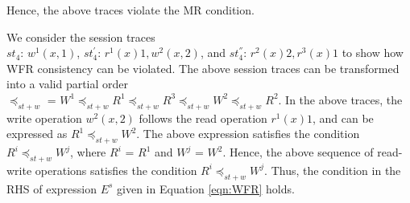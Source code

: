 \documentclass[journal,compsoc]{IEEEtran}
\begin{document}
    Hence, the above traces violate the MR condition.
\par  We consider the session traces \\ $\mathit{st}_4$: $w^1(x,1)$, $\mathit{st}_4^{'}$: $r^1(x){1}, w^2(x,2)$, and
 $\mathit{st}_4^{''}$: $r^2(x){2}, r^3(x){1}$ to show how
 WFR consistency can be violated. The above session traces can be transformed into a valid partial order \\
 $\preccurlyeq_{\mathit{st}+w}$  = $W^1 \preccurlyeq_{\mathit{st}+w} R^1 \preccurlyeq_{\mathit{st}+w} R^3 \preccurlyeq_{\mathit{st}+w} W^2 \preccurlyeq_{\mathit{st}+w} R^2$. In the above traces, the write operation $w^2(x,2)$ follows
  the read operation $r^1(x){1}$, and can be expressed as $R^1 \preccurlyeq_{\mathit{st}+w} W^2$. 	The above expression satisfies
 the condition $R^i \preccurlyeq_{\mathit{st}+w} W^j$, where $R^i$ = $R^1$ and $W^j$ = $W^2$. Hence,  
  the above sequence of read-write 
 operations satisfies the condition  $R^i \preccurlyeq_{\mathit{st}+w} W^j$. Thus, the condition in the RHS of  expression $E^s$ given in 
 Equation \ref{eqn:WFR} holds. %
\end{document}
